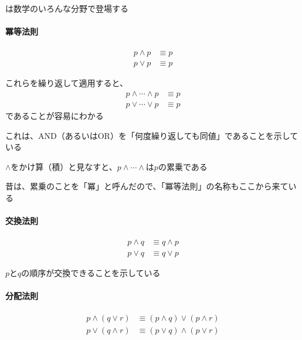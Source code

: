 \documentclass[../book_ronri-and-set]{subfiles}
\begin{document}
は数学のいろんな分野で登場する

\sectionline

\begin{oframed}
  \paragraph{冪等法則}
  \begin{align*}
    p \land p & \equiv p \\
    p \lor p  & \equiv p
  \end{align*}
\end{oframed}

これらを繰り返して適用すると、
\begin{align*}
  p \land \cdots \land p & \equiv p \\
  p \lor \cdots \lor p   & \equiv p
\end{align*}
であることが容易にわかる

これは、AND（あるいはOR）を「何度繰り返しても同値」であることを示している

\br

$\land$をかけ算（積）と見なすと、$  p \land \cdots \land$は$p$の累乗である

昔は、累乗のことを「冪」と呼んだので、「冪等法則」の名称もここから来ている

\sectionline

\begin{oframed}
  \paragraph{交換法則}
  \begin{align*}
    p \land q & \equiv q \land p \\
    p \lor q  & \equiv q \lor p
  \end{align*}
\end{oframed}

$p$と$q$の順序が交換できることを示している

\sectionline

\begin{oframed}
  \paragraph{分配法則}
  \begin{align*}
    p \land (q \lor r) & \equiv (p \land q) \lor (p \land r) \\
    p \lor (q \land r) & \equiv (p \lor q) \land (p \lor r)
  \end{align*}
\end{oframed}
\end{document}
